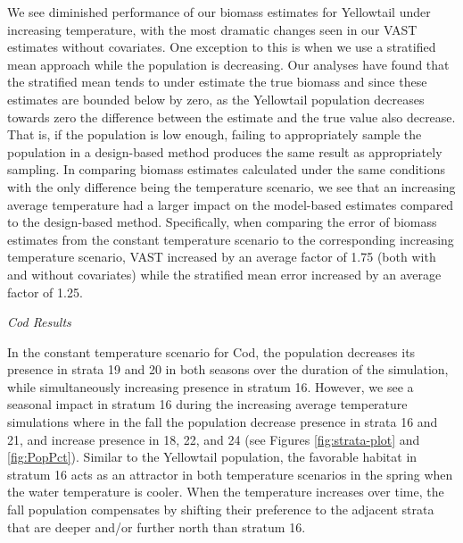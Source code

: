\documentclass[
  12pt,
]{article}
\begin{document}
We see diminished performance of our biomass estimates for Yellowtail under increasing temperature, with the most dramatic changes seen in our VAST estimates without covariates. One exception to this is when we use a stratified mean approach while the population is decreasing. Our analyses have found that the stratified mean tends to under estimate the true biomass and since these estimates are bounded below by zero, as the Yellowtail population decreases towards zero the difference between the estimate and the true value also decrease. That is, if the population is low enough, failing to appropriately sample the population in a design-based method produces the same result as appropriately sampling. In comparing biomass estimates calculated under the same conditions with the only difference being the temperature scenario, we see that an increasing average temperature had a larger impact on the model-based estimates compared to the design-based method. Specifically, when comparing the error of biomass estimates from the constant temperature scenario to the corresponding increasing temperature scenario, VAST increased by an average factor of 1.75 (both with and without covariates) while the stratified mean error increased by an average factor of 1.25.

\emph{Cod Results}

In the constant temperature scenario for Cod, the population decreases its presence in strata 19 and 20 in both seasons over the duration of the simulation, while simultaneously increasing presence in stratum 16. However, we see a seasonal impact in stratum 16 during the increasing average temperature simulations where in the fall the population decrease presence in strata 16 and 21, and increase presence in 18, 22, and 24 (see Figures \ref{fig:strata-plot} and \ref{fig:PopPct}). Similar to the Yellowtail population, the favorable habitat in stratum 16 acts as an attractor in both temperature scenarios in the spring when the water temperature is cooler. When the temperature increases over time, the fall population compensates by shifting their preference to the adjacent strata that are deeper and/or further north than stratum 16.
\end{document}
